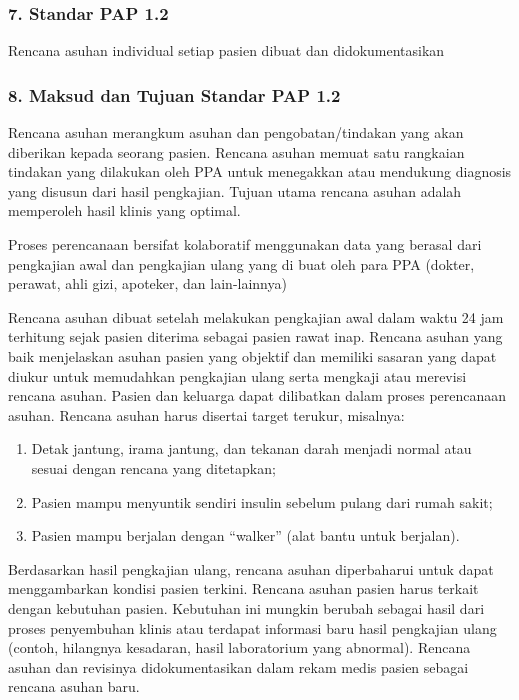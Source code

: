 \documentclass[
]{book}
\providecommand{\tightlist}{%
  \setlength{\itemsep}{0pt}\setlength{\parskip}{0pt}}
\begin{document}
\hypertarget{standar-pap-1.2}{%
\subsubsection*{7. Standar PAP 1.2}\label{standar-pap-1.2}}

Rencana asuhan individual setiap pasien dibuat dan didokumentasikan

\hypertarget{maksud-dan-tujuan-standar-pap-1.2}{%
\subsubsection*{8. Maksud dan Tujuan Standar PAP 1.2}\label{maksud-dan-tujuan-standar-pap-1.2}}

Rencana asuhan merangkum asuhan dan pengobatan/tindakan yang akan diberikan kepada seorang pasien. Rencana asuhan memuat satu rangkaian tindakan yang dilakukan oleh PPA untuk menegakkan atau mendukung diagnosis yang disusun dari hasil pengkajian. Tujuan utama rencana asuhan adalah memperoleh hasil klinis yang optimal.

Proses perencanaan bersifat kolaboratif menggunakan data yang berasal dari pengkajian awal dan pengkajian ulang yang di buat oleh para PPA (dokter, perawat, ahli gizi, apoteker, dan lain-lainnya)

Rencana asuhan dibuat setelah melakukan pengkajian awal dalam waktu 24 jam terhitung sejak pasien diterima sebagai pasien rawat inap. Rencana asuhan yang baik menjelaskan asuhan pasien yang objektif dan memiliki sasaran yang dapat diukur untuk memudahkan pengkajian ulang serta mengkaji atau merevisi rencana asuhan. Pasien dan keluarga dapat dilibatkan dalam proses perencanaan asuhan. Rencana asuhan harus disertai target terukur, misalnya:

\begin{enumerate}
\def\labelenumi{\alph{enumi}.}
\tightlist
\item
  Detak jantung, irama jantung, dan tekanan darah menjadi normal atau sesuai dengan rencana yang ditetapkan;
\item
  Pasien mampu menyuntik sendiri insulin sebelum pulang dari rumah sakit;
\item
  Pasien mampu berjalan dengan ``walker'' (alat bantu untuk berjalan).
\end{enumerate}

Berdasarkan hasil pengkajian ulang, rencana asuhan diperbaharui untuk dapat menggambarkan kondisi pasien terkini. Rencana asuhan pasien harus terkait dengan kebutuhan pasien. Kebutuhan ini mungkin berubah sebagai hasil dari proses penyembuhan klinis atau terdapat informasi baru hasil pengkajian ulang (contoh, hilangnya kesadaran, hasil laboratorium yang abnormal). Rencana asuhan dan revisinya didokumentasikan dalam rekam medis pasien sebagai rencana asuhan baru.
\end{document}
